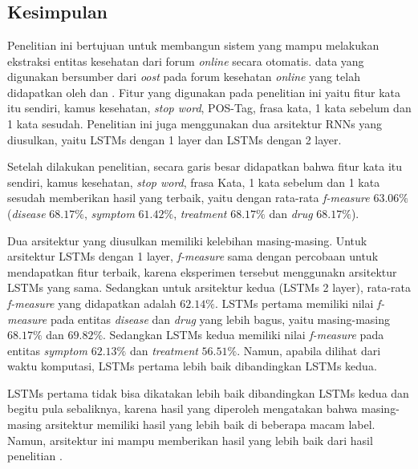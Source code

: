 \chapter{\babEnam}

\section{Kesimpulan}
Penelitian ini bertujuan untuk membangun sistem yang mampu melakukan ekstraksi entitas kesehatan dari forum \textit{online} secara otomatis. data yang digunakan bersumber dari \textit{oost} pada forum kesehatan \textit{online} yang telah didapatkan oleh \cite{skripsiKakRadit} dan \saya. Fitur yang digunakan pada penelitian ini yaitu fitur kata itu sendiri, kamus kesehatan, \textit{stop word}, POS-Tag, frasa kata,  1 kata sebelum dan 1 kata sesudah. Penelitian ini juga menggunakan dua arsitektur RNNs yang diusulkan, yaitu LSTMs dengan 1 layer dan LSTMs dengan 2 layer.

Setelah dilakukan penelitian, secara garis besar didapatkan bahwa fitur kata itu sendiri, kamus kesehatan, \textit{stop word}, frasa Kata,  1 kata sebelum dan 1 kata sesudah memberikan hasil yang terbaik, yaitu dengan rata-rata \textit{f-measure} $ 63.06\% $ (\textit{disease} $ 68.17\% $, \textit{symptom} $ 61.42\% $, \textit{treatment} $ 68.17\% $ dan \textit{drug} $ 68.17\% $).

Dua arsitektur yang diusulkan memiliki kelebihan masing-masing. Untuk arsitektur LSTMs dengan 1 layer, \textit{f-measure} sama dengan percobaan untuk mendapatkan fitur terbaik, karena eksperimen tersebut menggunakn arsitektur LSTMs yang sama. Sedangkan untuk arsitektur kedua (LSTMs 2 layer), rata-rata \textit{f-measure} yang didapatkan adalah $ 62.14\% $. LSTMs pertama memiliki nilai \textit{f-measure} pada entitas \textit{disease} dan \textit{drug} yang lebih bagus, yaitu masing-masing $ 68.17\% $ dan $ 69.82\% $. Sedangkan LSTMs kedua memiliki nilai \textit{f-measure} pada entitas \textit{symptom} $ 62.13\% $ dan \textit{treatment} $ 56.51\% $. Namun, apabila dilihat dari waktu komputasi, LSTMs pertama lebih baik dibandingkan LSTMs kedua.

LSTMs pertama tidak bisa dikatakan lebih baik dibandingkan LSTMs kedua dan begitu pula sebaliknya, karena hasil yang diperoleh mengatakan bahwa masing-masing arsitektur memiliki hasil yang lebih baik di beberapa macam label. Namun, arsitektur ini mampu memberikan hasil yang lebih baik dari hasil penelitian \cite{skripsiKakRadit}.

